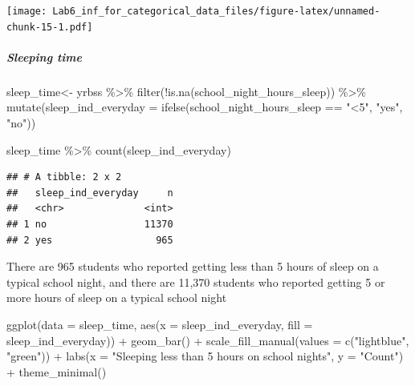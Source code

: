 \documentclass[
]{article}
\newenvironment{Shaded}{\begin{snugshade}}{\end{snugshade}}
\newcommand{\AttributeTok}[1]{\textcolor[rgb]{0.77,0.63,0.00}{#1}}
\newcommand{\FunctionTok}[1]{\textcolor[rgb]{0.00,0.00,0.00}{#1}}
\newcommand{\NormalTok}[1]{#1}
\newcommand{\OtherTok}[1]{\textcolor[rgb]{0.56,0.35,0.01}{#1}}
\newcommand{\SpecialCharTok}[1]{\textcolor[rgb]{0.00,0.00,0.00}{#1}}
\newcommand{\StringTok}[1]{\textcolor[rgb]{0.31,0.60,0.02}{#1}}
\begin{document}
\texttt{[image: Lab6\_inf\_for\_categorical\_data\_files/figure-latex/unnamed-chunk-15-1.pdf]}

\hypertarget{sleeping-time}{%
\subparagraph{Sleeping time}\label{sleeping-time}}

\begin{Shaded}
\begin{Highlighting}[]
\NormalTok{sleep\_time}\OtherTok{\textless{}{-}}\NormalTok{ yrbss }\SpecialCharTok{\%\textgreater{}\%}
  \FunctionTok{filter}\NormalTok{(}\SpecialCharTok{!}\FunctionTok{is.na}\NormalTok{(school\_night\_hours\_sleep)) }\SpecialCharTok{\%\textgreater{}\%}
  \FunctionTok{mutate}\NormalTok{(}\AttributeTok{sleep\_ind\_everyday =} \FunctionTok{ifelse}\NormalTok{(school\_night\_hours\_sleep }\SpecialCharTok{==} \StringTok{"\textless{}5"}\NormalTok{, }\StringTok{"yes"}\NormalTok{, }\StringTok{"no"}\NormalTok{))}

\NormalTok{sleep\_time }\SpecialCharTok{\%\textgreater{}\%}
  \FunctionTok{count}\NormalTok{(sleep\_ind\_everyday)}
\end{Highlighting}
\end{Shaded}

\begin{verbatim}
## # A tibble: 2 x 2
##   sleep_ind_everyday     n
##   <chr>              <int>
## 1 no                 11370
## 2 yes                  965
\end{verbatim}

There are 965 students who reported getting less than 5 hours of sleep
on a typical school night, and there are 11,370 students who reported
getting 5 or more hours of sleep on a typical school night

\begin{Shaded}
\begin{Highlighting}[]
\FunctionTok{ggplot}\NormalTok{(}\AttributeTok{data =}\NormalTok{ sleep\_time, }\FunctionTok{aes}\NormalTok{(}\AttributeTok{x =}\NormalTok{ sleep\_ind\_everyday, }\AttributeTok{fill =}\NormalTok{ sleep\_ind\_everyday)) }\SpecialCharTok{+} 
  \FunctionTok{geom\_bar}\NormalTok{() }\SpecialCharTok{+} 
  \FunctionTok{scale\_fill\_manual}\NormalTok{(}\AttributeTok{values =} \FunctionTok{c}\NormalTok{(}\StringTok{"lightblue"}\NormalTok{, }\StringTok{"green"}\NormalTok{)) }\SpecialCharTok{+}
  \FunctionTok{labs}\NormalTok{(}\AttributeTok{x =} \StringTok{"Sleeping less than 5 hours on school nights"}\NormalTok{, }\AttributeTok{y =} \StringTok{"Count"}\NormalTok{) }\SpecialCharTok{+}
  \FunctionTok{theme\_minimal}\NormalTok{()}
\end{Highlighting}
\end{Shaded}
\end{document}

